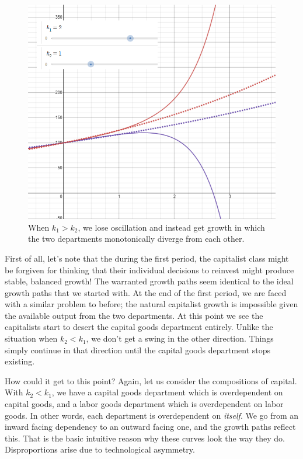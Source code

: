\documentclass{article}
\theoremstyle{theorem}
\begin{document}
\begin{figure}[H] 
\centering
\includegraphics[scale=.5]{Images/monotonicG}
\caption{When $k_1 > k_2$, we lose oscillation and instead get growth in which the two departments monotonically diverge from each other.} 
\end{figure}
First of all, let's note that the during the first period, the capitalist class might be forgiven for thinking that their individual decisions to reinvest might produce stable, balanced growth! The warranted growth paths seem identical to the ideal growth paths that we started with. At the end of the first period, we are faced with a similar problem to before; the natural capitalist growth is impossible given the available output from the two departments. At this point we see the capitalists start to desert the capital goods department entirely. Unlike the situation when $k_2 < k_1$, we don't get a swing in the other direction. Things simply continue in that direction until the capital goods department stops existing. \par 
How could it get to this point? Again, let us consider the compositions of capital. With $k_2 < k_1$, we have a capital goods department which is overdependent on capital goods, and a labor goods department which is overdependent on labor goods. In other words, each department is overdependent on \emph{itself}. We go from an inward facing dependency to an outward facing one, and the growth paths reflect this. That is the basic intuitive reason why these curves look the way they do. Disproportions arise due to technological asymmetry. \par 
\end{document}
